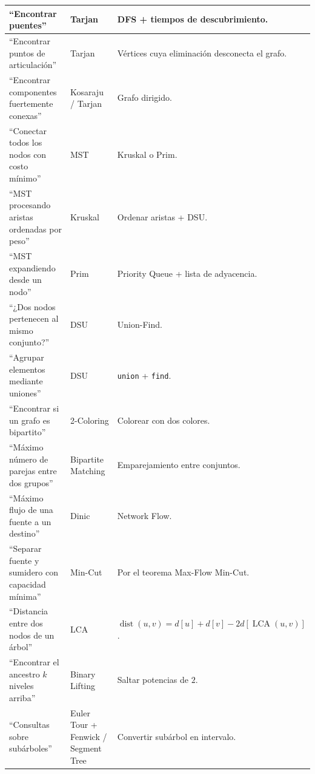 \documentclass[10pt,a4paper,twocolumn]{article}
\begin{document}
\begin{table}[H]
\begin{tabular}{|p{}|p{}|p{}|}
``Encontrar puentes'' &
Tarjan &
DFS + tiempos de descubrimiento. \\
\hline

``Encontrar puntos de articulación'' &
Tarjan &
Vértices cuya eliminación desconecta el grafo. \\
\hline

``Encontrar componentes fuertemente conexas'' &
Kosaraju / Tarjan &
Grafo dirigido. \\
\hline

``Conectar todos los nodos con costo mínimo'' &
MST &
Kruskal o Prim. \\
\hline

``MST procesando aristas ordenadas por peso'' &
Kruskal &
Ordenar aristas + DSU. \\
\hline

``MST expandiendo desde un nodo'' &
Prim &
Priority Queue + lista de adyacencia. \\
\hline

``¿Dos nodos pertenecen al mismo conjunto?'' &
DSU &
Union-Find. \\
\hline

``Agrupar elementos mediante uniones'' &
DSU &
\texttt{union} + \texttt{find}. \\
\hline

``Encontrar si un grafo es bipartito'' &
2-Coloring &
Colorear con dos colores. \\
\hline

``Máximo número de parejas entre dos grupos'' &
Bipartite Matching &
Emparejamiento entre conjuntos. \\
\hline

``Máximo flujo de una fuente a un destino'' &
Dinic &
Network Flow. \\
\hline

``Separar fuente y sumidero con capacidad mínima'' &
Min-Cut &
Por el teorema Max-Flow Min-Cut. \\
\hline

``Distancia entre dos nodos de un árbol'' &
LCA &
$\operatorname{dist}(u,v)=
d[u]+d[v]-2d[\operatorname{LCA}(u,v)]$. \\
\hline

``Encontrar el ancestro $k$ niveles arriba'' &
Binary Lifting &
Saltar potencias de $2$. \\
\hline

``Consultas sobre subárboles'' &
Euler Tour + Fenwick / Segment Tree &
Convertir subárbol en intervalo. \\
\hline


\end{tabular}
\end{table}
\end{document}
